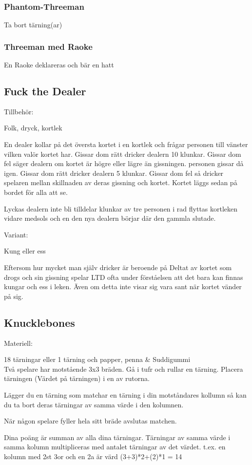 \subsubsection*{Phantom-Threeman}

Ta bort tärning(ar)

\subsubsection*{Threeman med Raoke}

En Raoke deklareras och bär en hatt

\newpage

\subsection*{\textbf{Fuck the Dealer}}

Tillbehör:

Folk, dryck, kortlek

En dealer kollar på det översta kortet i en kortlek och frågar personen till vänster vilken valör kortet har. Gissar dom rätt dricker dealern 10 klunkar. Gissar dom fel säger dealern om kortet är högre eller lägre än gissningen. personen gissar då igen. Gissar dom rätt dricker dealern 5 klunkar. Gissar dom fel så dricker spelaren mellan skillnaden av deras gissning och kortet. Kortet läggs sedan på bordet för alla att se.

Lyckas dealern inte bli tilldelar klunkar av tre personen i rad flyttas kortleken vidare medsols och en den nya dealern börjar där den gammla slutade.

Variant:

Kung eller ess

Eftersom hur mycket man själv dricker är beroende på Deltat av kortet som drogs och sin gissning spelar LTD ofta under förståelsen att det bara kan finnas kungar och ess i leken. Även om detta inte visar sig vara sant när kortet vänder på sig.

\subsection*{\textbf{Knucklebones}}

Materiell:

18 tärningar eller 1 tärning och papper, penna \& Suddigummi\\

Två spelare har motstående 3x3 bräden. Gå i tufr och rullar en tärning. Placera tärningen (Värdet på tärningen) i en av rutorna.

Lägger du en tärning som matchar en tärning i din motståndares kollumn så kan du ta bort deras tärningar av samma värde i den kolumnen.

När någon spelare fyller hela sitt bräde avslutas matchen.

Dina poäng är summan av alla dina tärningar. Tärningar av samma värde i samma kolumn multipliceras med antalet tärningar av det värdet. t.ex. en kolumn med 2st 3or och en 2a är värd (3+3)*2+(2)*1 = 14

\newpage